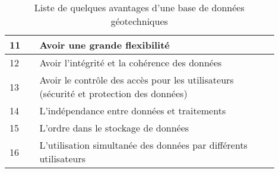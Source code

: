 \begin{table}
\begin{tabular}{|p{0.10\linewidth}|p{0.80\linewidth}|}
                \hline 
                    11 &
                    Avoir une grande flexibilité
                    \\
                \hline 
                    12 &
                    Avoir l'intégrité et la cohérence des données
                    \\
                \hline 
                    13 &
                    Avoir le contrôle des accès pour les utilisateurs (sécurité et protection des données)
                    \\
                \hline 
                    14 &
                    L'indépendance entre données et traitements
                    \\
                \hline 
                    15 &
                    L'ordre dans le stockage de données
                    \\
                \hline 
                    16 &
                    L'utilisation simultanée des données par différents utilisateurs
                    \\
            \hline 
        \end{tabular}
        \caption{Liste de quelques avantages d'une base de données géotechniques} \label{tab:avantages}
\end{table}
\par

